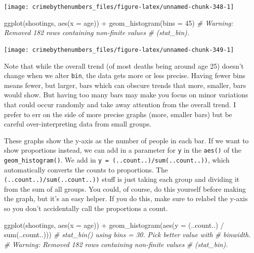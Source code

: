 \documentclass[
  a4paper,
]{krantz}
\makeatletter
\newenvironment{Shaded}{\begin{snugshade}}{\end{snugshade}}
\newcommand{\AttributeTok}[1]{\textcolor[rgb]{0.77,0.63,0.00}{#1}}
\newcommand{\CommentTok}[1]{\textcolor[rgb]{0.56,0.35,0.01}{\textit{#1}}}
\newcommand{\DecValTok}[1]{\textcolor[rgb]{0.00,0.00,0.81}{#1}}
\newcommand{\FunctionTok}[1]{\textcolor[rgb]{0.00,0.00,0.00}{#1}}
\newcommand{\NormalTok}[1]{#1}
\newcommand{\SpecialCharTok}[1]{\textcolor[rgb]{0.00,0.00,0.00}{#1}}
\newenvironment{kframe}{%
\medskip{}
\setlength{\fboxsep}{.8em}
 \def\at@end@of@kframe{}%
 \ifinner\ifhmode%
  \def\at@end@of@kframe{\end{minipage}}%
  \begin{minipage}{\columnwidth}%
 \fi\fi%
 \def\FrameCommand##1{\hskip\@totalleftmargin \hskip-\fboxsep
 \colorbox{shadecolor}{##1}\hskip-\fboxsep
     \hskip-\linewidth \hskip-\@totalleftmargin \hskip\columnwidth}%
 \MakeFramed {\advance\hsize-\width
   \@totalleftmargin\z@ \linewidth\hsize
   \@setminipage}}%
 {\par\unskip\endMakeFramed%
 \at@end@of@kframe}
\renewenvironment{Shaded}{\begin{kframe}}{\end{kframe}}
\makeatother
\begin{document}
\begin{center}\texttt{[image: crimebythenumbers\_files/figure-latex/unnamed-chunk-348-1]} \end{center}

\begin{Shaded}
\begin{Highlighting}[]
\FunctionTok{ggplot}\NormalTok{(shootings, }\FunctionTok{aes}\NormalTok{(}\AttributeTok{x =}\NormalTok{ age)) }\SpecialCharTok{+}
  \FunctionTok{geom\_histogram}\NormalTok{(}\AttributeTok{bins =} \DecValTok{45}\NormalTok{)}
\CommentTok{\# Warning: Removed 182 rows containing non{-}finite values}
\CommentTok{\# (stat\_bin).}
\end{Highlighting}
\end{Shaded}

\begin{center}\texttt{[image: crimebythenumbers\_files/figure-latex/unnamed-chunk-349-1]} \end{center}

Note that while the overall trend (of most deaths being
around age 25) doesn't change when we alter \texttt{bin},
the data gets more or less precise. Having fewer bins means
fewer, but larger, bars which can obscure trends that more,
smaller, bars would show. But having too many bars may make
you focus on minor variations that could occur randomly and
take away attention from the overall trend. I prefer to err
on the side of more precise graphs (more, smaller bars) but
be careful over-interpreting data from small groups.

These graphs show the y-axis as the number of people in each
bar. If we want to show proportions instead, we can add in a
parameter for \texttt{y} in the \texttt{aes()} of the
\texttt{geom\_histogram()}. We add in
\texttt{y\ =\ (..count..)/sum(..count..))}, which
automatically converts the counts to proportions. The
\texttt{(..count..)/sum(..count..))} stuff is just taking
each group and dividing it from the sum of all groups. You
could, of course, do this yourself before making the graph,
but it's an easy helper. If you do this, make sure to
relabel the y-axis so you don't accidentally call the
proportions a count.

\begin{Shaded}
\begin{Highlighting}[]
\FunctionTok{ggplot}\NormalTok{(shootings, }\FunctionTok{aes}\NormalTok{(}\AttributeTok{x =}\NormalTok{ age)) }\SpecialCharTok{+}
  \FunctionTok{geom\_histogram}\NormalTok{(}\FunctionTok{aes}\NormalTok{(}\AttributeTok{y =}\NormalTok{ (..count..) }\SpecialCharTok{/} \FunctionTok{sum}\NormalTok{(..count..)))}
\CommentTok{\# \textasciigrave{}stat\_bin()\textasciigrave{} using \textasciigrave{}bins = 30\textasciigrave{}. Pick better value with}
\CommentTok{\# \textasciigrave{}binwidth\textasciigrave{}.}
\CommentTok{\# Warning: Removed 182 rows containing non{-}finite values}
\CommentTok{\# (stat\_bin).}
\end{Highlighting}
\end{Shaded}
\end{document}
